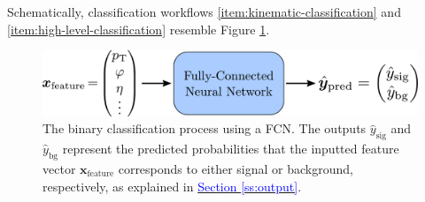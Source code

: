\documentclass[11pt, a4paper]{article}
\newcommand{\myhref}[2]{\hyperref[#1]{\textcolor{blue}{#2}}}
\renewcommand{\vec}[1]{\bm{#1}}
\begin{document}
Schematically, classification workflows \ref{item:kinematic-classification} and \ref{item:high-level-classification} resemble Figure \ref{fig:fcn-in-out}.
\begin{figure}[htb!]
    \centering
    \includegraphics[width=0.9\linewidth]{vector/fcn-in-out.pdf}
    \caption{The binary classification process using a FCN.
    The outputs $ \hat{y}_{\text{sig}} $ and $ \hat{y}_{\text{bg}} $ represent the predicted probabilities that the inputted feature vector $ \vec{x}_{\text{feature}} $ corresponds to either signal or background, respectively, as explained in \myhref{ss:output}{Section \ref{ss:output}}.}
    \label{fig:fcn-in-out}
\end{figure}

\end{document}
